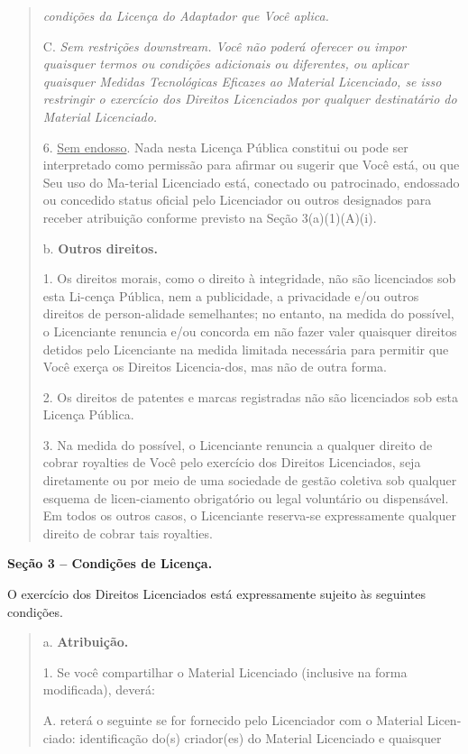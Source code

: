 \documentclass[
]{article}
\begin{document}
\begin{quote}
\emph{condições da Licença do Adaptador que Você aplica.}

C. \emph{Sem restrições downstream. Você não poderá oferecer ou impor
quaisquer termos ou condições adicionais ou diferentes, ou aplicar
quaisquer Medidas Tecnológicas Eficazes ao Material Licenciado, se isso
restringir o exercício dos Direitos Licenciados por qualquer
destinatário do Material Licenciado.}

6. \uline{Sem endosso}. Nada nesta Licença Pública constitui ou pode ser
interpretado como permissão para afirmar ou sugerir que Você está, ou
que Seu uso do Ma-terial Licenciado está, conectado ou patrocinado,
endossado ou concedido status oficial pelo Licenciador ou outros
designados para receber atribuição conforme previsto na Seção
3(a)(1)(A)(i).

b. \textbf{Outros direitos.}

1. Os direitos morais, como o direito à integridade, não são licenciados
sob esta Li-cença Pública, nem a publicidade, a privacidade e/ou outros
direitos de person-alidade semelhantes; no entanto, na medida do
possível, o Licenciante renuncia e/ou concorda em não fazer valer
quaisquer direitos detidos pelo Licenciante na medida limitada
necessária para permitir que Você exerça os Direitos Licencia-dos, mas
não de outra forma.

2. Os direitos de patentes e marcas registradas não são licenciados sob
esta Licença Pública.

3. Na medida do possível, o Licenciante renuncia a qualquer direito de
cobrar royalties de Você pelo exercício dos Direitos Licenciados, seja
diretamente ou por meio de uma sociedade de gestão coletiva sob qualquer
esquema de licen-ciamento obrigatório ou legal voluntário ou
dispensável. Em todos os outros casos, o Licenciante reserva-se
expressamente qualquer direito de cobrar tais royalties.
\end{quote}

\textbf{Seção 3 -- Condições de Licença.}

O exercício dos Direitos Licenciados está expressamente sujeito às
seguintes condições.

\begin{quote}
a. \textbf{Atribuição.}

1. Se você compartilhar o Material Licenciado (inclusive na forma
modificada), deverá:

A. reterá o seguinte se for fornecido pelo Licenciador com o Material
Licen-ciado: identificação do(s) criador(es) do Material Licenciado e
quaisquer
\end{quote}
\end{document}
